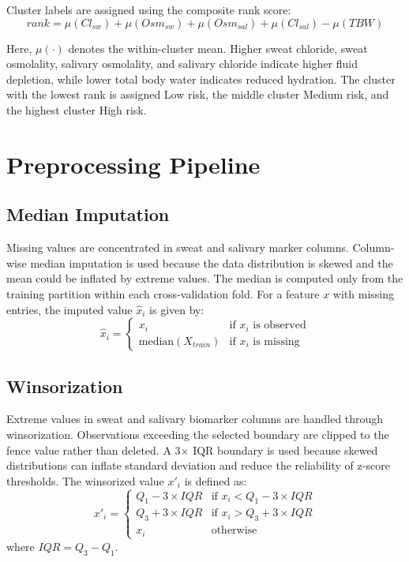 Cluster labels are assigned using the composite rank score:
\begin{equation}
\label{eq:rank-score}
rank = \mu(Cl_{sw}) + \mu(Osm_{sw}) + \mu(Osm_{sal}) + \mu(Cl_{sal}) - \mu(TBW)
\end{equation}

Here, $\mu(\cdot)$ denotes the within-cluster mean. Higher sweat chloride, sweat osmolality, salivary osmolality, and salivary chloride indicate higher fluid depletion, while lower total body water indicates reduced hydration. The cluster with the lowest rank is assigned Low risk, the middle cluster Medium risk, and the highest cluster High risk.

\section{Preprocessing Pipeline}

\subsection{Median Imputation}

Missing values are concentrated in sweat and salivary marker columns. Column-wise median imputation is used because the data distribution is skewed and the mean could be inflated by extreme values. The median is computed only from the training partition within each cross-validation fold. For a feature $x$ with missing entries, the imputed value $\hat{x}_i$ is given by:
\begin{equation}
\label{eq:median-imputation}
\hat{x}_i = 
\begin{cases} 
x_i & \text{if } x_i \text{ is observed} \\
\text{median}(X_{train}) & \text{if } x_i \text{ is missing}
\end{cases}
\end{equation}

\subsection{Winsorization}

Extreme values in sweat and salivary biomarker columns are handled through winsorization. Observations exceeding the selected boundary are clipped to the fence value rather than deleted. A 3$\times$ IQR boundary is used because skewed distributions can inflate standard deviation and reduce the reliability of z-score thresholds. The winsorized value $x'_i$ is defined as:
\begin{equation}
\label{eq:winsorization}
x'_i = 
\begin{cases} 
Q_1 - 3 \times IQR & \text{if } x_i < Q_1 - 3 \times IQR \\
Q_3 + 3 \times IQR & \text{if } x_i > Q_3 + 3 \times IQR \\
x_i & \text{otherwise}
\end{cases}
\end{equation}
where $IQR = Q_3 - Q_1$.

